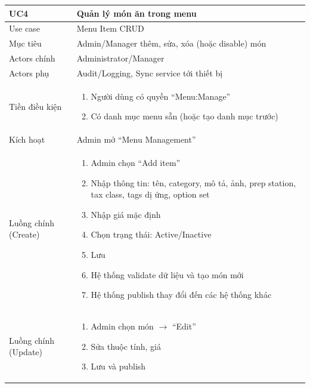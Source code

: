\begin{longtable}{|>{\raggedright\arraybackslash}p{}|>{\raggedright\arraybackslash}p{}|}
\hline
\textbf{UC4} & \textbf{Quản lý món ăn trong menu} \\
\hline
Use case & Menu Item CRUD \\
\hline
Mục tiêu & Admin/Manager thêm, sửa, xóa (hoặc disable) món \\
\hline
Actors chính & Administrator/Manager \\
\hline
Actors phụ & Audit/Logging, Sync service tới thiết bị \\
\hline
Tiền điều kiện &
\vspace{-0.5em}
\begin{enumerate}[leftmargin=*]
\item Người dùng có quyền “Menu:Manage”
\item Có danh mục menu sẵn (hoặc tạo danh mục trước)
\end{enumerate}
\vspace{-0.5em}
\\
\hline
Kích hoạt & Admin mở “Menu Management” \\
\hline
Luồng chính (Create) &
\vspace{-0.5em}
\begin{enumerate}[leftmargin=*]
\item Admin chọn “Add item”
\item Nhập thông tin: tên, category, mô tả, ảnh, prep station, tax class, tags dị ứng, option set
\item Nhập giá mặc định
\item Chọn trạng thái: Active/Inactive
\item Lưu
\item Hệ thống validate dữ liệu và tạo món mới
\item Hệ thống publish thay đổi đến các hệ thống khác
\end{enumerate}
\vspace{-0.5em}
\\
\hline
Luồng chính (Update) &
\vspace{-0.5em}
\begin{enumerate}[leftmargin=*]
\item Admin chọn món $\rightarrow$ “Edit”
\item Sửa thuộc tính, giá
\item Lưu và publish
\end{enumerate}

\end{longtable}
